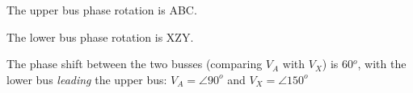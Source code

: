 The upper bus phase rotation is ABC.

\vskip 10pt

The lower bus phase rotation is XZY.

\vskip 10pt

The phase shift between the two busses (comparing $V_A$ with $V_X$) is 60$^{o}$, with the lower bus {\it leading} the upper bus: $V_A = \angle 90^o$ and $V_X = \angle 150^o$












